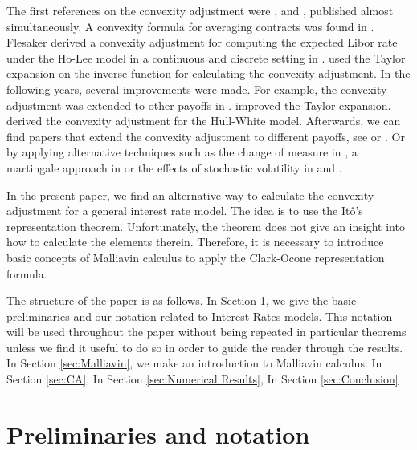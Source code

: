 \documentclass[a4paper,10pt]{article}
\newcommand{\1}{\mathbf{1}}
\begin{document}
The first references on the convexity adjustment were \cite{RitchkenS}, \cite{Flesaker} and \cite{BrothertonIben}, published almost simultaneously. A convexity formula for averaging contracts was found in \cite{RitchkenS}. Flesaker derived a convexity adjustment for computing the expected Libor rate under the Ho-Lee model in a continuous and discrete setting in \cite{Flesaker}. \cite{BrothertonIben} used the Taylor expansion on the inverse function for calculating the convexity adjustment. In the following years, several improvements were made. For example, the convexity adjustment was extended to other payoffs in \cite{Hull06}. \cite{Hart} improved the Taylor expansion. \cite{KirikosNovak} derived the convexity adjustment for the Hull-White model. Afterwards, we can find papers that extend the convexity adjustment to different payoffs, see \cite{Benhamou00WC} or \cite{Hagan03}. Or by applying alternative techniques such as the change of measure in \cite{Pelsser}, a martingale approach in \cite{Benhamou00} or the effects of stochastic volatility in \cite{PiterbargRenedo} and \cite{HaganWoodward20}.

In the present paper, we find an alternative way to calculate the convexity adjustment for a general interest rate model. The idea is to use the It\^o's representation theorem. Unfortunately, the theorem does not give an insight into how to calculate the elements therein. Therefore, it is necessary to introduce basic concepts of Malliavin calculus to apply the Clark-Ocone representation formula.


The structure of the paper is as follows. In Section \ref{sec:Notation}, we give the basic preliminaries and our notation related to Interest Rates models. This notation will be used throughout the paper without being repeated in particular theorems unless we find it useful to do so in order to guide the reader through the results. In Section \ref{sec:Malliavin}, we make an introduction to Malliavin calculus. In Section \ref{sec:CA}, In Section \ref{sec:Numerical Results}, In Section \ref{sec:Conclusion}


\section{Preliminaries and notation}\label{sec:Notation}
\end{document}
